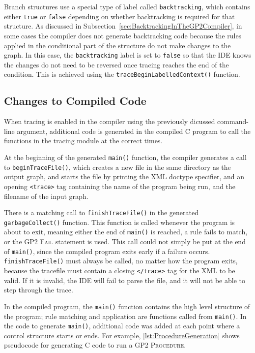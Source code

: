 \documentclass[authoryearcitations]{UoYCSproject}
\begin{document}
Branch structures use a special type of label called \texttt{backtracking}, which
contains either \texttt{true} or \texttt{false} depending on whether backtracking
is required for that structure. As discussed in Subsection~\ref{sec:BacktrackingInTheGP2Compiler},
in some cases the compiler does not generate backtracking code because the
rules applied in the conditional part of the structure do not make changes to
the graph. In this case, the \texttt{backtracking} label is set to \texttt{false}
so that the IDE knows the changes do not need to be reversed once tracing reaches
the end of the condition. This is achieved using the \texttt{traceBeginLabelledContext()}
function.


\subsection{Changes to Compiled Code}
\label{sec:ChangesToCompiledCode}

When tracing is enabled in the compiler using the previously dicussed command-line
argument, additional code is generated in the compiled C program to call the
functions in the tracing module at the correct times.

At the beginning of the generated \texttt{main()} function, the compiler generates
a call to \texttt{beginTraceFile()}, which creates a new file in the same
directory as the output graph, and starts the file by printing the XML doctype
specifier, and an opening \texttt{<trace>} tag containing the name of the program
being run, and the filename of the input graph.

There is a matching call to \texttt{finishTraceFile()} in the generated \texttt{garbageCollect()}
function. This function is called whenever the program is about to exit, meaning
either the end of \texttt{main()} is reached, a rule fails to match, or the GP2
\textsc{Fail} statement is used. This call could not simply be put at the end
of \texttt{main()}, since the compiled program exits early if a failure occurs.
\texttt{finishTraceFile()} must always be called, no matter how the program exits,
because the tracefile must contain a closing \texttt{</trace>} tag for the XML
to be valid. If it is invalid, the IDE will fail to parse the file, and it will
not be able to step through the trace.

In the compiled program, the \texttt{main()} function contains the high level
structure of the program; rule matching and application are functions called
from \texttt{main()}. In the code to generate \texttt{main()}, additional code
was added at each point where a control structure starts or ends. For example,
\autoref{lst:ProcedureGeneration} shows pseudocode for generating C code to
run a GP2 \textsc{Procedure}. 
\end{document}
